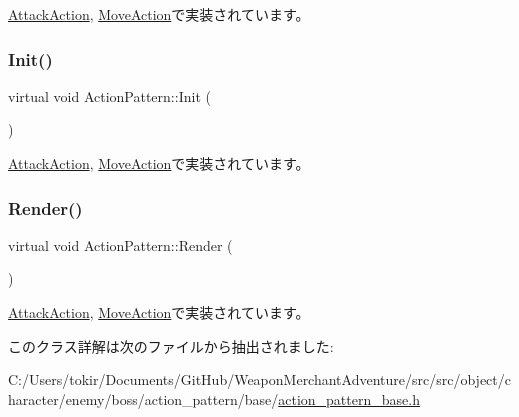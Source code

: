 \mbox{\hyperlink{class_attack_action_aa91f60f80fc0c76f321fbf2da3945c43}{Attack\+Action}}, \mbox{\hyperlink{class_move_action_a48727a426f2a69ed62631af8385ff6ef}{Move\+Action}}で実装されています。

\mbox{\label{class_action_pattern_ac8f2228ca469ce6fe29a9775bf393e0e}} 
\subsubsection{\texorpdfstring{Init()}{Init()}}
{\footnotesize\ttfamily virtual void Action\+Pattern\+::\+Init (\begin{DoxyParamCaption}{ }\end{DoxyParamCaption})\hspace{0.3cm}{\ttfamily [pure virtual]}}



\mbox{\hyperlink{class_attack_action_afd8d8c674040a1361c35d1703f36b30e}{Attack\+Action}}, \mbox{\hyperlink{class_move_action_a0861a4a0fcbab38f8c33ed02b9f3c1b8}{Move\+Action}}で実装されています。

\mbox{\label{class_action_pattern_a313199aa5d15b6f9381b916ffe23fe6a}} 
\subsubsection{\texorpdfstring{Render()}{Render()}}
{\footnotesize\ttfamily virtual void Action\+Pattern\+::\+Render (\begin{DoxyParamCaption}{ }\end{DoxyParamCaption})\hspace{0.3cm}{\ttfamily [pure virtual]}}



\mbox{\hyperlink{class_attack_action_a779cc8743807e3e5d01cb3dd14f92bd7}{Attack\+Action}}, \mbox{\hyperlink{class_move_action_a3f427440c2409e0633ff0f6040a0320c}{Move\+Action}}で実装されています。



このクラス詳解は次のファイルから抽出されました\+:\begin{DoxyCompactItemize}
\item 
C\+:/\+Users/tokir/\+Documents/\+Git\+Hub/\+Weapon\+Merchant\+Adventure/src/src/object/character/enemy/boss/action\+\_\+pattern/base/\mbox{\hyperlink{action__pattern__base_8h}{action\+\_\+pattern\+\_\+base.\+h}}\end{DoxyCompactItemize}

